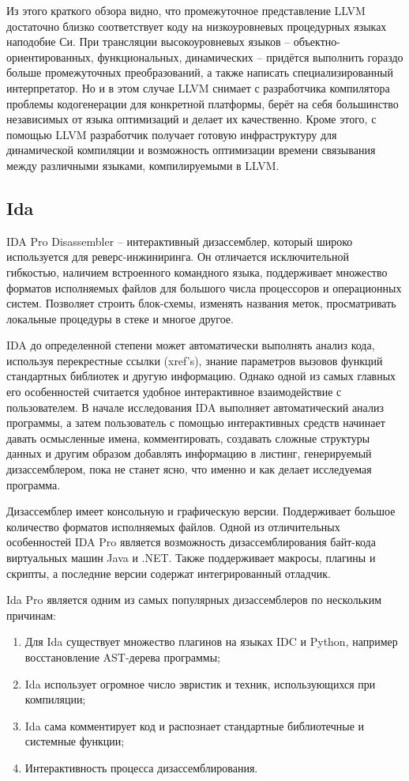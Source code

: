 Из этого краткого обзора видно, что промежуточное представление LLVM достаточно близко соответствует коду на низкоуровневых процедурных языках наподобие Си. При трансляции высокоуровневых языков -- объектно-ориентированных, функциональных, динамических -- придётся выполнить гораздо больше промежуточных преобразований, а также написать специализированный интерпретатор. Но и в этом случае LLVM снимает с разработчика компилятора проблемы кодогенерации для конкретной платформы, берёт на себя большинство независимых от языка оптимизаций и делает их качественно. Кроме этого, с помощью LLVM разработчик получает готовую инфраструктуру для динамической компиляции и возможность оптимизации времени связывания между различными языками, компилируемыми в LLVM.

\subsection{Ida}
IDA Pro Disassembler -- интерактивный дизассемблер, который широко используется для реверс-инжиниринга. Он отличается исключительной гибкостью, наличием встроенного командного языка, поддерживает множество форматов исполняемых файлов для большого числа процессоров и операционных систем. Позволяет строить блок-схемы, изменять названия меток, просматривать локальные процедуры в стеке и многое другое.

IDA до определенной степени может автоматически выполнять анализ кода, используя перекрестные ссылки (xref's), знание параметров вызовов функций стандартных библиотек и другую информацию. Однако одной из самых главных его особенностей считается удобное интерактивное взаимодействие с пользователем. В начале исследования IDA выполняет автоматический анализ программы, а затем пользователь с помощью интерактивных средств начинает давать осмысленные имена, комментировать, создавать сложные структуры данных и другим образом добавлять информацию в листинг, генерируемый дизассемблером, пока не станет ясно, что именно и как делает исследуемая программа.

Дизассемблер имеет консольную и графическую версии. Поддерживает большое количество форматов исполняемых файлов. Одной из отличительных особенностей IDA Pro является возможность дизассемблирования байт-кода виртуальных машин Java и .NET. Также поддерживает макросы, плагины и скрипты, а последние версии содержат интегрированный отладчик.\cite{Ida}

Ida Pro является одним из самых популярных дизассемблеров по нескольким причинам:
\begin{enumerate}
    \item Для Ida существует множество плагинов на языках IDC и Python, например восстановление AST-дерева программы;
    \item Ida использует огромное число эвристик и техник, использующихся при компиляции;
    \item Ida сама комментирует код и распознает стандартные библиотечные и системные функции;
    \item Интерактивность процесса дизассемблирования.
\end{enumerate}

